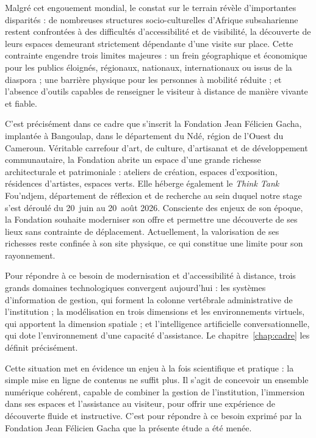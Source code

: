 Malgré cet engouement mondial, le constat sur le terrain révèle d'importantes
disparités : de nombreuses structures socio-culturelles d'Afrique subsaharienne
restent confrontées à des difficultés d'accessibilité et de visibilité, la
découverte de leurs espaces demeurant strictement dépendante d'une visite sur
place. Cette contrainte engendre trois limites majeures : un frein géographique
et économique pour les publics éloignés, régionaux, nationaux, internationaux ou
issus de la diaspora ; une barrière physique pour les personnes à mobilité
réduite ; et l'absence d'outils capables de renseigner le visiteur à distance de
manière vivante et fiable.

C'est précisément dans ce cadre que s'inscrit la Fondation Jean Félicien Gacha,
implantée à Bangoulap, dans le département du Ndé, région de l'Ouest du
Cameroun. Véritable carrefour d'art, de culture, d'artisanat et de développement
communautaire, la Fondation abrite un espace d'une grande richesse
architecturale et patrimoniale : ateliers de création, espaces d'exposition,
résidences d'artistes, espaces verts. Elle héberge également le \emph{Think
Tank} Fou'ndjem, département de réflexion et de recherche au sein duquel notre
stage s'est déroulé du 20~juin au 20~août 2026. Consciente des enjeux de son
époque, la Fondation souhaite moderniser son offre et permettre une découverte
de ses lieux sans contrainte de déplacement. Actuellement, la valorisation de
ses richesses reste confinée à son site physique, ce qui constitue une limite
pour son rayonnement.

Pour répondre à ce besoin de modernisation et d'accessibilité à distance, trois
grands domaines technologiques convergent aujourd'hui : les systèmes
d'information de gestion, qui forment la colonne vertébrale administrative de
l'institution ; la modélisation en trois dimensions et les environnements
virtuels, qui apportent la dimension spatiale ; et l'intelligence artificielle
conversationnelle, qui dote l'environnement d'une capacité d'assistance. Le
chapitre~\ref{chap:cadre} les définit précisément.

Cette situation met en évidence un enjeu à la fois scientifique et pratique : la
simple mise en ligne de contenus ne suffit plus. Il s'agit de concevoir un
ensemble numérique cohérent, capable de combiner la gestion de l'institution,
l'immersion dans ses espaces et l'assistance au visiteur, pour offrir une
expérience de découverte fluide et instructive. C'est pour répondre à ce besoin
exprimé par la Fondation Jean Félicien Gacha que la présente étude a été menée.

